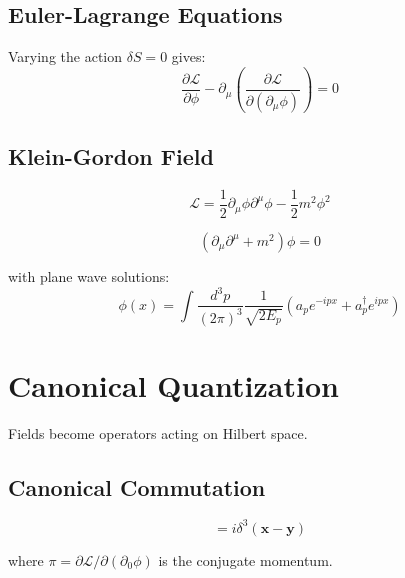 \subsection{Euler-Lagrange Equations}

\begin{theorem}
\label{thm:euler-lagrange}
Varying the action $\delta S = 0$ gives:
\begin{equation}
\frac{\partial\mathcal{L}}{\partial\phi} - \partial_\mu\left(\frac{\partial\mathcal{L}}{\partial(\partial_\mu\phi)}\right) = 0
\end{equation}
\end{theorem}

\subsection{Klein-Gordon Field}

\begin{definition}
\label{def:kg}
\begin{equation}
\mathcal{L} = \frac{1}{2}\partial_\mu\phi\partial^\mu\phi - \frac{1}{2}m^2\phi^2
\end{equation}
\end{definition}

\begin{proposition}
\label{prop:kg-eq}
\begin{equation}
(\partial_\mu\partial^\mu + m^2)\phi = 0
\end{equation}

with plane wave solutions:
\begin{equation}
\phi(x) = \int \frac{d^3p}{(2\pi)^3}\frac{1}{\sqrt{2E_p}}(a_p e^{-ipx} + a_p^\dagger e^{ipx})
\end{equation}
\end{proposition}

\section{Canonical Quantization}

Fields become operators acting on Hilbert space.

\subsection{Canonical Commutation}

\begin{definition}
\label{def:field-ops}
\begin{equation}
[\phi(t,\mathbf{x}), \pi(t,\mathbf{y})] = i\delta^3(\mathbf{x}-\mathbf{y})
\end{equation}

where $\pi = \partial\mathcal{L}/\partial(\partial_0\phi)$ is the conjugate momentum.
\end{definition}

